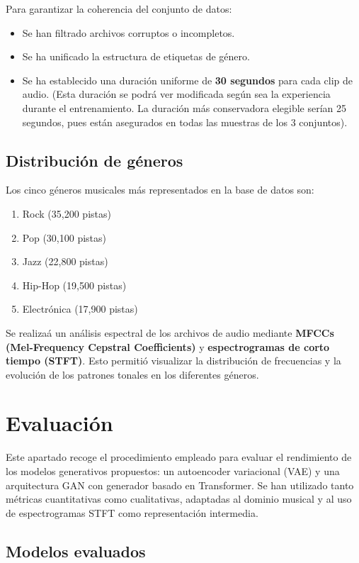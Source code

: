Para garantizar la coherencia del conjunto de datos:
\begin{itemize}
\item Se han filtrado archivos corruptos o incompletos.
\item Se ha unificado la estructura de etiquetas de género.
\item Se ha establecido una duración uniforme de \textbf{30 segundos} para cada clip de audio. (Esta duración se podrá ver modificada según sea la experiencia durante el entrenamiento. La duración más conservadora elegible serían 25 segundos, pues están asegurados en todas las muestras de los 3 conjuntos).
\end{itemize}

\subsection{Distribución de géneros}
Los cinco géneros musicales más representados en la base de datos son:
\begin{enumerate}
\item Rock (35,200 pistas)
\item Pop (30,100 pistas)
\item Jazz (22,800 pistas)
\item Hip-Hop (19,500 pistas)
\item Electrónica (17,900 pistas)
\end{enumerate}

Se realizaá un análisis espectral de los archivos de audio mediante \textbf{MFCCs (Mel-Frequency Cepstral Coefficients)} y \textbf{espectrogramas de corto tiempo (STFT)}. Esto permitió visualizar la distribución de frecuencias y la evolución de los patrones tonales en los diferentes géneros.

\section{Evaluación}

Este apartado recoge el procedimiento empleado para evaluar el rendimiento de los modelos generativos propuestos: un autoencoder variacional (VAE) y una arquitectura GAN con generador basado en Transformer. Se han utilizado tanto métricas cuantitativas como cualitativas, adaptadas al dominio musical y al uso de espectrogramas STFT como representación intermedia.

\subsection{Modelos evaluados}

